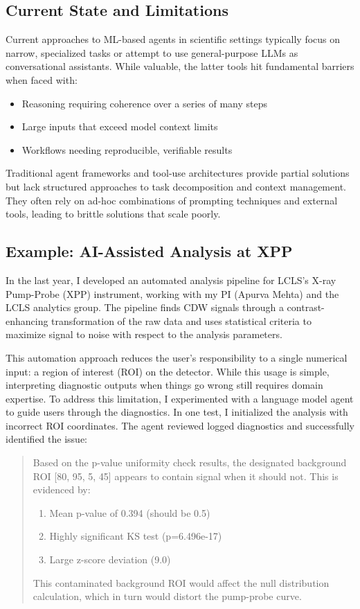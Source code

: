 \documentclass{article}
\begin{document}
\subsection{Current State and Limitations}
Current approaches to ML-based agents in scientific settings typically focus on narrow, specialized tasks or attempt to use general-purpose LLMs as conversational assistants. While valuable, the latter tools hit fundamental barriers when faced with:
\begin{itemize}
    \item Reasoning requiring coherence over a series of many steps
    \item Large inputs that exceed model context limits
    \item Workflows needing reproducible, verifiable results
\end{itemize}

Traditional agent frameworks and tool-use architectures provide partial solutions but lack structured approaches to task decomposition and context management. They often rely on ad-hoc combinations of prompting techniques and external tools, leading to brittle solutions that scale poorly.

\subsection{Example: AI-Assisted Analysis at XPP}
In the last year, I developed an automated analysis pipeline for LCLS's X-ray Pump-Probe (XPP) instrument, working with my PI (Apurva Mehta) and the LCLS analytics group. The pipeline finds CDW signals through a contrast-enhancing transformation of the raw data and uses statistical criteria to maximize signal to noise with respect to the analysis parameters.

This automation approach reduces the user's responsibility to a single numerical input: a region of interest (ROI) on the detector. While this usage is simple, interpreting diagnostic outputs when things go wrong still requires domain expertise. To address this limitation, I experimented with a language model agent to guide users through the diagnostics. In one test, I initialized the analysis with incorrect ROI coordinates. The agent reviewed logged diagnostics and successfully identified the issue:

\begin{quote}
Based on the p-value uniformity check results, the designated background ROI [80, 95, 5, 45] appears to contain signal when it should not. This is evidenced by:
\begin{enumerate}
    \item Mean p-value of 0.394 (should be 0.5)
    \item Highly significant KS test (p=6.496e-17)
    \item Large z-score deviation (9.0)
\end{enumerate}

This contaminated background ROI would affect the null distribution calculation, which in turn would distort the pump-probe curve.
\end{quote}
\end{document}
